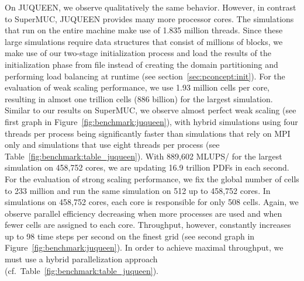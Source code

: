 \documentclass[final,leqno,onefignum,onetabnum]{siamltex1213}
\newcommand{\MLUPSPS}{\mbox{MLUPS/}}
\begin{document}
On JUQUEEN, we observe qualitatively the same behavior.
However, in contrast to SuperMUC, JUQUEEN provides many more processor cores.
The simulations that run on the entire machine make use of 1.835 million threads.
Since these large simulations require data structures that consist of millions of blocks,
we make use of our two-stage initialization process and load
the results of the initialization phase from file instead of creating the domain partitioning and
performing load balancing at runtime (see section~\ref{sec:pconcept:init}).
For the evaluation of weak scaling performance, we use 1.93 million cells per core, resulting in almost one trillion cells (886 billion) for the largest simulation.
Similar to our results on SuperMUC, we observe almost perfect weak scaling (see first graph in Figure~\ref{fig:benchmark:juqueen}),
with hybrid simulations using four threads per process being significantly faster than simulations that rely on MPI only and
simulations that use eight threads per process (see Table~\ref{fig:benchmark:table_juqueen}).
With 889,602 \MLUPSPS{} for the largest simulation on 458,752 cores, we are updating 16.9 trillion PDFs in each second.
For the evaluation of strong scaling performance, we fix the global number of cells to 233 million and run the same simulation on 512 up to 458,752 cores.
In simulations on 458,752 cores, each core is responsible for only 508 cells.
Again, we observe parallel efficiency decreasing when more processes are used and when fewer cells are assigned to each core.
Throughput, however, constantly increases up to 98 time steps per second on the finest grid (see second graph in Figure~\ref{fig:benchmark:juqueen}).
In order to achieve maximal throughput, we must use a hybrid parallelization approach (cf.~Table~\ref{fig:benchmark:table_juqueen}).
\end{document}

